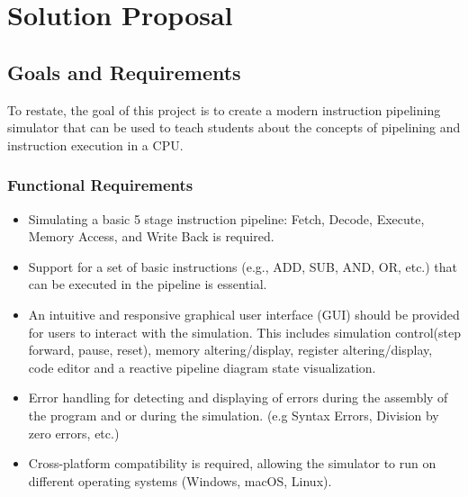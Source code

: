 \chapter{Solution Proposal}
\label{chap:solution}
\section{Goals and Requirements}\label{sec:solution}
To restate, the goal of this project is to create a modern instruction pipelining simulator that can be used to teach students about the concepts of pipelining and instruction execution in a CPU.

\subsection{Functional Requirements}
\begin{itemize}
    \item Simulating a basic 5 stage instruction pipeline: Fetch, Decode, Execute, Memory Access, and Write Back is required.
    \item Support for a set of basic instructions (e.g., ADD, SUB, AND, OR, etc.) that can be executed in the pipeline is essential.
    \item An intuitive and responsive graphical user interface (GUI) should be provided for users to interact with the simulation. This includes simulation control(step forward, pause, reset), memory altering/display, register altering/display, code editor and a reactive pipeline diagram state visualization.
    \item Error handling for detecting and displaying of errors during the assembly of the program and or during the simulation. (e.g Syntax Errors, Division by zero errors, etc.)
    \item Cross-platform compatibility is required, allowing the simulator to run on different operating systems (Windows, macOS, Linux).
\end{itemize}
